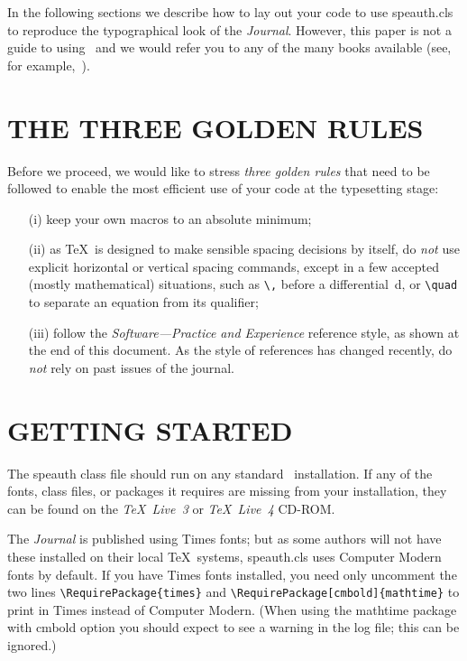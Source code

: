 \documentclass{speauth}
\begin{document}
In the following sections we describe how to lay out your code to use
\textsf{speauth.cls} to reproduce the typographical look of the \emph{Journal}.
However, this paper is not a guide to using \LaTeXe\ and we would refer you
to any of the many books available
(see, for example,~\cite{Companion,KopkaDaly,Lamport}).

\section{THE THREE GOLDEN RULES}
Before we proceed, we would like to stress \emph{three golden rules}
that need to be followed to enable the most efficient use of your code
at the typesetting stage:
\begin{enumerate}
\item[(i)]
keep your own macros to an absolute minimum;
\item[(ii)]
as \TeX\ is designed to make sensible spacing decisions by itself,
do \emph{not} use explicit horizontal or vertical spacing commands,
except in a few accepted (mostly mathematical) situations, such as
\verb"\," before a differential~d,
or \verb"\quad" to separate an equation from its qualifier;
\item[(iii)]
follow the \emph{Software---Practice and Experience} reference style,
as shown at the end of this document. As the style of references has
changed recently, do \emph{not} rely on past issues of the journal.
\end{enumerate}

\section{GETTING STARTED}
The \textsf{speauth} class file
should run on any standard \LaTeXe\ installation.
If any of the fonts, class files, or packages it requires
are missing from your installation, they can be found on
the \emph{\TeX\ Live~3}
or \emph{\TeX\ Live~4}
CD-ROM.

The \emph{Journal} is published using Times fonts; but as some authors
will not have these installed on their local \TeX\ systems,
\textsf{speauth.cls} uses Computer Modern fonts by default.
If you have Times fonts installed, you need only uncomment the two lines
\verb"\RequirePackage{times}" and
\verb"\RequirePackage[cmbold]{mathtime}"
to print in Times instead of Computer Modern.
(When using the \textsf{mathtime} package with \textsf{cmbold} option
you should expect to see a warning in the log file; this can be ignored.)
\end{document}
